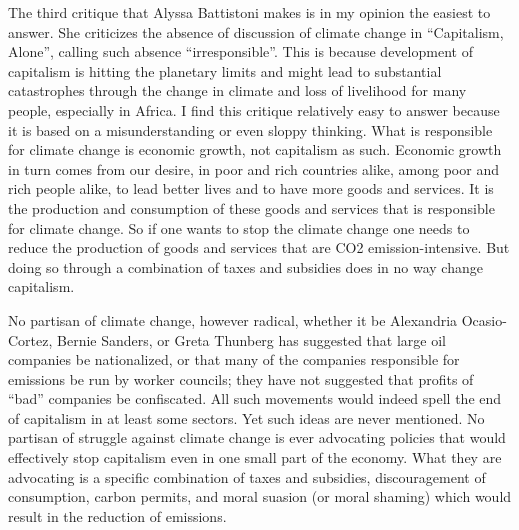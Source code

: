 \documentclass[
]{book}
\begin{document}
The third critique that Alyssa Battistoni makes is in my opinion the easiest to answer. She criticizes the absence of discussion of climate change in ``Capitalism, Alone'', calling such absence ``irresponsible''. This is because development of capitalism is hitting the planetary limits and might lead to substantial catastrophes through the change in climate and loss of livelihood for many people, especially in Africa. I find this critique relatively easy to answer because it is based on a misunderstanding or even sloppy thinking. What is responsible for climate change is economic growth, not capitalism as such. Economic growth in turn comes from our desire, in poor and rich countries alike, among poor and rich people alike, to lead better lives and to have more goods and services. It is the production and consumption of these goods and services that is responsible for climate change. So if one wants to stop the climate change one needs to reduce the production of goods and services that are CO2 emission-intensive. But doing so through a combination of taxes and subsidies does in no way change capitalism.

No partisan of climate change, however radical, whether it be Alexandria Ocasio-Cortez, Bernie Sanders, or Greta Thunberg has suggested that large oil companies be nationalized, or that many of the companies responsible for emissions be run by worker councils; they have not suggested that profits of ``bad'' companies be confiscated. All such movements would indeed spell the end of capitalism in at least some sectors. Yet such ideas are never mentioned. No partisan of struggle against climate change is ever advocating policies that would effectively stop capitalism even in one small part of the economy. What they are advocating is a specific combination of taxes and subsidies, discouragement of consumption, carbon permits, and moral suasion (or moral shaming) which would result in the reduction of emissions.
\end{document}

